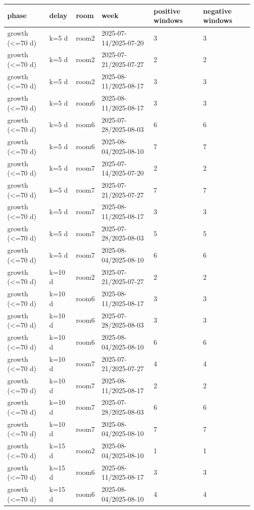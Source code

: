\begin{tabular}{llllll}
\hline
phase & delay & room & week & positive windows & negative windows \\
\hline
growth (<=70 d) & k=5 d & room2 & 2025-07-14/2025-07-20 & 3 & 3 \\
growth (<=70 d) & k=5 d & room2 & 2025-07-21/2025-07-27 & 2 & 2 \\
growth (<=70 d) & k=5 d & room2 & 2025-08-11/2025-08-17 & 3 & 3 \\
growth (<=70 d) & k=5 d & room6 & 2025-08-11/2025-08-17 & 3 & 3 \\
growth (<=70 d) & k=5 d & room6 & 2025-07-28/2025-08-03 & 6 & 6 \\
growth (<=70 d) & k=5 d & room6 & 2025-08-04/2025-08-10 & 7 & 7 \\
growth (<=70 d) & k=5 d & room7 & 2025-07-14/2025-07-20 & 2 & 2 \\
growth (<=70 d) & k=5 d & room7 & 2025-07-21/2025-07-27 & 7 & 7 \\
growth (<=70 d) & k=5 d & room7 & 2025-08-11/2025-08-17 & 3 & 3 \\
growth (<=70 d) & k=5 d & room7 & 2025-07-28/2025-08-03 & 5 & 5 \\
growth (<=70 d) & k=5 d & room7 & 2025-08-04/2025-08-10 & 6 & 6 \\
growth (<=70 d) & k=10 d & room2 & 2025-07-21/2025-07-27 & 2 & 2 \\
growth (<=70 d) & k=10 d & room6 & 2025-08-11/2025-08-17 & 3 & 3 \\
growth (<=70 d) & k=10 d & room6 & 2025-07-28/2025-08-03 & 3 & 3 \\
growth (<=70 d) & k=10 d & room6 & 2025-08-04/2025-08-10 & 6 & 6 \\
growth (<=70 d) & k=10 d & room7 & 2025-07-21/2025-07-27 & 4 & 4 \\
growth (<=70 d) & k=10 d & room7 & 2025-08-11/2025-08-17 & 2 & 2 \\
growth (<=70 d) & k=10 d & room7 & 2025-07-28/2025-08-03 & 6 & 6 \\
growth (<=70 d) & k=10 d & room7 & 2025-08-04/2025-08-10 & 7 & 7 \\
growth (<=70 d) & k=15 d & room2 & 2025-08-04/2025-08-10 & 1 & 1 \\
growth (<=70 d) & k=15 d & room6 & 2025-08-11/2025-08-17 & 3 & 3 \\
growth (<=70 d) & k=15 d & room6 & 2025-08-04/2025-08-10 & 4 & 4 \\

\end{tabular}

